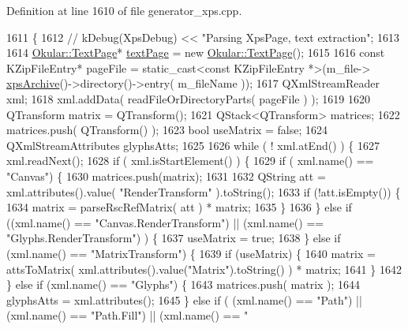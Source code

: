 Definition at line 1610 of file generator\+\_\+xps.\+cpp.


\begin{DoxyCode}
1611 \{
1612     \textcolor{comment}{// kDebug(XpsDebug) << "Parsing XpsPage, text extraction";}
1613 
1614     \hyperlink{classOkular_1_1TextPage}{Okular::TextPage}* \hyperlink{classXpsPage_a6aee6a94650e230c3f84cf75ae4bc55f}{textPage} = \textcolor{keyword}{new} \hyperlink{classOkular_1_1TextPage}{Okular::TextPage}();
1615 
1616     \textcolor{keyword}{const} KZipFileEntry* pageFile = \textcolor{keyword}{static\_cast<}\textcolor{keyword}{const }KZipFileEntry *\textcolor{keyword}{>}(m\_file->
      \hyperlink{classXpsFile_a13a633163a15934693b3c65eae2a0c4f}{xpsArchive}()->directory()->entry( m\_fileName ));
1617     QXmlStreamReader xml;
1618     xml.addData( readFileOrDirectoryParts( pageFile ) );
1619 
1620     QTransform matrix = QTransform();
1621     QStack<QTransform> matrices;
1622     matrices.push( QTransform() );
1623     \textcolor{keywordtype}{bool} useMatrix = \textcolor{keyword}{false};
1624     QXmlStreamAttributes glyphsAtts;
1625 
1626     \textcolor{keywordflow}{while} ( ! xml.atEnd() ) \{
1627         xml.readNext();
1628         \textcolor{keywordflow}{if} ( xml.isStartElement() ) \{
1629             \textcolor{keywordflow}{if} ( xml.name() == \textcolor{stringliteral}{"Canvas"}) \{
1630                 matrices.push(matrix);
1631 
1632                 QString att = xml.attributes().value( \textcolor{stringliteral}{"RenderTransform"} ).toString();
1633                 \textcolor{keywordflow}{if} (!att.isEmpty()) \{
1634                     matrix = parseRscRefMatrix( att ) * matrix;
1635                 \}
1636             \} \textcolor{keywordflow}{else} \textcolor{keywordflow}{if} ((xml.name() == \textcolor{stringliteral}{"Canvas.RenderTransform"}) || (xml.name() == \textcolor{stringliteral}{"Glyphs.RenderTransform"})
      ) \{
1637                 useMatrix = \textcolor{keyword}{true};
1638             \} \textcolor{keywordflow}{else} \textcolor{keywordflow}{if} (xml.name() == \textcolor{stringliteral}{"MatrixTransform"}) \{
1639                 \textcolor{keywordflow}{if} (useMatrix) \{
1640                     matrix = attsToMatrix( xml.attributes().value(\textcolor{stringliteral}{"Matrix"}).toString() ) * matrix;
1641                 \}
1642             \} \textcolor{keywordflow}{else} \textcolor{keywordflow}{if} (xml.name() == \textcolor{stringliteral}{"Glyphs"}) \{
1643                 matrices.push( matrix );
1644                 glyphsAtts = xml.attributes();
1645             \} \textcolor{keywordflow}{else} \textcolor{keywordflow}{if} ( (xml.name() == \textcolor{stringliteral}{"Path"}) || (xml.name() == \textcolor{stringliteral}{"Path.Fill"}) || (xml.name() == \textcolor{stringliteral}{"
}
\end{DoxyCode}
